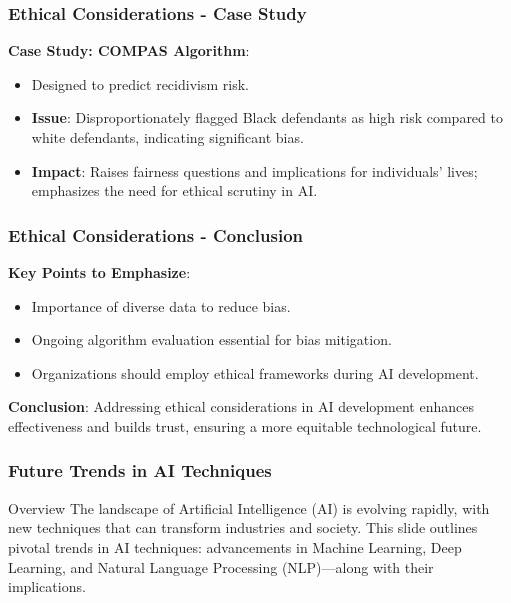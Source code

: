 \documentclass{beamer}
\begin{document}
\begin{frame}[fragile]
    \frametitle{Ethical Considerations - Case Study}
    \textbf{Case Study: COMPAS Algorithm}:
    \begin{itemize}
        \item Designed to predict recidivism risk.
        \item \textbf{Issue}: Disproportionately flagged Black defendants as high risk compared to white defendants, indicating significant bias.
        \item \textbf{Impact}: Raises fairness questions and implications for individuals' lives; emphasizes the need for ethical scrutiny in AI.
    \end{itemize}
\end{frame}

\begin{frame}[fragile]
    \frametitle{Ethical Considerations - Conclusion}
    \textbf{Key Points to Emphasize}:
    \begin{itemize}
        \item Importance of diverse data to reduce bias.
        \item Ongoing algorithm evaluation essential for bias mitigation.
        \item Organizations should employ ethical frameworks during AI development.
    \end{itemize}

    \textbf{Conclusion}:
    Addressing ethical considerations in AI development enhances effectiveness and builds trust, ensuring a more equitable technological future.
\end{frame}

\begin{frame}
    \frametitle{Future Trends in AI Techniques}
    \begin{block}{Overview}
        The landscape of Artificial Intelligence (AI) is evolving rapidly, with new techniques that can transform industries and society. This slide outlines pivotal trends in AI techniques: advancements in Machine Learning, Deep Learning, and Natural Language Processing (NLP)—along with their implications.
    \end{block}
\end{frame}
\end{document}
